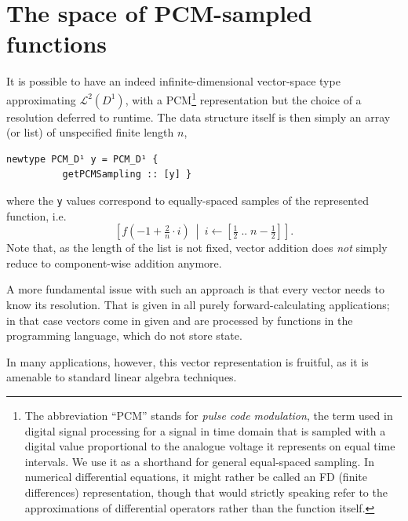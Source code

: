 \documentclass[sigplan,review,anonymous]{acmart}\settopmatter{printfolios=true,printccs=false,printacmref=false}
\theoremstyle{acmplain}
\theoremstyle{acmdefinition}
\begin{document}
\section{The space of PCM-sampled functions}
It is possible to have an indeed infinite-dimensional vector-space type approximating $\mathcal{L}^2(D^1)$, with a PCM\footnote{%
The abbreviation “PCM” stands for \emph{pulse code modulation}, the term used in digital signal processing for a signal in time domain that is sampled with a digital value proportional to the analogue voltage it represents on equal time intervals. We use it as a shorthand for general equal-spaced sampling. In numerical differential equations, it might rather be called an FD (finite differences) representation, though that would strictly speaking refer to the approximations of differential operators rather than the function itself.
} representation but the choice of a resolution deferred to runtime. The data structure itself is then simply an array (or list) of unspecified finite length $n$,
\begin{lstlisting}
newtype PCM_D¹ y = PCM_D¹ {
          getPCMSampling :: [y] }
\end{lstlisting}
where the \lstinline`y` values correspond to equally-spaced samples of the represented function, i.e.
\[
  \left[f(-1 + \tfrac2n\cdot i)\ \middle|\ i\leftarrow[\tfrac12\;..\;n-\tfrac12]\right].
\]
Note that, as the length of the list is not fixed,
vector addition does \emph{not} simply reduce to component-wise addition anymore.

A more fundamental issue with such an approach is that every vector needs to know its resolution.
That is given in all purely forward-calculating applications; in that case vectors come in given and are processed by functions in the programming language, which do not store state.

In many applications, however, this vector representation is fruitful, as it is amenable to standard linear algebra techniques.
\end{document}
